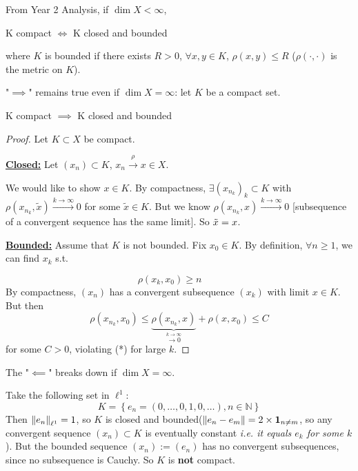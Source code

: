 \documentclass{article}
\begin{document}
\begin{remark}
    From Year 2 Analysis, if $\dim X < \infty$,  
    \begin{center}
        K compact $\iff$ K closed and bounded
    \end{center}
    where $K$ is bounded if there exists $R>0$, $\forall x,y \in K$, $\rho(x,y) \leq R$ ($\rho(\cdot, \cdot)$ is the metric on $K$). 
\end{remark}  

\begin{remark}
    "$\implies$" remains true even if $\dim X = \infty$: let $K$ be a compact set.
\end{remark}

\begin{proposition}
\label{comapct implies ...}
    K compact $\implies$ K closed and bounded
\end{proposition}
\begin{proof}
Let $K\subset X$ be compact.  

\underline{\textbf{Closed:}}\nextline  
Let $(x_n) \subset K$, $x_n \overset{\rho}{\longrightarrow} x \in X$.  

We would like to show $x \in K$. By compactness, $\exists (x_{n_k})_k \subset K$ with $\rho(x_{n_k}, \tilde{x}) \overset{k\to \infty}{\longrightarrow} 0$ for some $\tilde{x} \in K$. But we know $\rho(x_{n_k}, x)\overset{k\to \infty}{\longrightarrow} 0$ [subsequence of a convergent sequence has the same limit]. So $\Tilde{x}=x$. 

\underline{\textbf{Bounded:}}\nextline
Assume that $K$ is not bounded. Fix $x_0 \in K$. By definition, $\forall n \geq 1$, we can find $x_k$ s.t. 

$$
\rho(x_k, x_0) \geq n \qquad
$$  
By compactness, $(x_n)$ has a convergent subsequence $(x_k)$ with limit $x \in K$. But then 
$$
\rho(x_{n_k}, x_0) \leq \underbrace{\rho(x_{n_k}, x)}_{\overset{k \to \infty}{\longrightarrow 0}} + \rho(x, x_0) \leq C
$$
for some $C>0$, violating (*) for large $k$.
\end{proof}

The "$\impliedby$" breaks down if $\dim X = \infty$.

\begin{example}
    Take the following set in $\ell^1$:  
    \begin{equation*}
        K = \left\{ e_n = (0, \ldots, 0, 1, 0, \ldots), n \in \mathbb{N} \right\}
    \end{equation*}  
    Then $\left\|{e_n}\right\|_{\ell^1}=1$, so $K$ is closed and bounded($\left\|{e_n-e_m}\right\| = 2 \times \mathbf{1}_{n\neq m}$, so any convergent sequence $(x_n) \subset K$ is eventually constant \textit{i.e. it equals $e_k$ for some $k$}). But the bounded sequence $(x_n) := (e_n)$ has no convergent subsequences, since no subsequence is Cauchy. So $K$ is \textbf{not} compact.
\end{example}  
\end{document}
